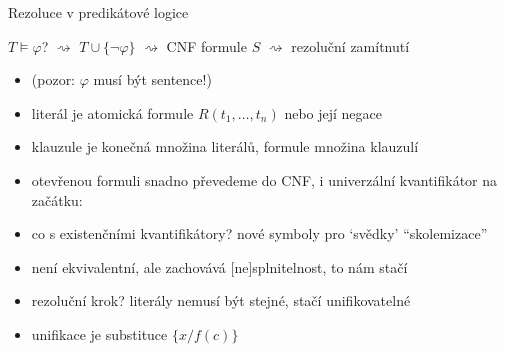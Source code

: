 \documentclass{beamer}
\begin{document}
\begin{frame}{Rezoluce v predikátové logice}

    $T\models\varphi$? {\Large$\rightsquigarrow$} $T\cup\{\neg \varphi\}$ {\Large$\rightsquigarrow$} CNF formule $S$ {\Large$\rightsquigarrow$} rezoluční zamítnutí

    \begin{itemize}[<+->]
        \item[] (pozor: $\varphi$ musí být \alert{sentence}!)        
        \item \alert{literál} je \alert{atomická formule} $R(t_1,\dots,t_n)$ nebo její negace
        \item \alert{klauzule} je konečná množina literálů, \alert{formule} množina klauzulí
        \item otevřenou formuli snadno převedeme do CNF, i univerzální kvantifikátor na začátku:{\small{}}
        \item co s existenčními kvantifikátory? nové symboly pro `svědky'
        {\small{}} ``\alert{skolemizace}''
        \item není ekvivalentní, ale zachovává \alert{[ne]splnitelnost}, to nám stačí
        \item rezoluční krok? literály nemusí být stejné, stačí \alert{unifikovatelné}
        {}
        \item \alert{unifikace} je substituce $\{x/f(c)\}$
    \end{itemize}

\end{frame}
\end{document}
